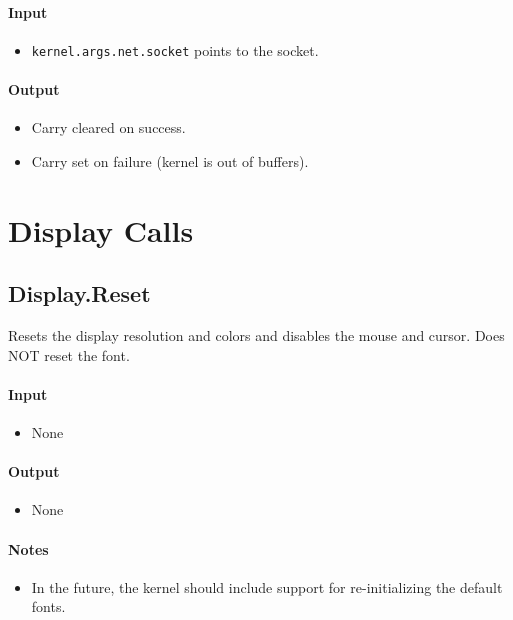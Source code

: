 \paragraph{Input}
\begin{itemize}
\item \verb+kernel.args.net.socket+ points to the socket.
\end{itemize}

\paragraph{Output}
\begin{itemize}
\item Carry cleared on success.
\item Carry set on failure (kernel is out of buffers).
\end{itemize}

\section*{Display Calls}

\subsection*{Display.Reset}
Resets the display resolution and colors and disables the mouse and cursor.  Does NOT reset the font.

\paragraph{Input}
\begin{itemize}
\item None
\end{itemize}

\paragraph{Output}
\begin{itemize}
\item None
\end{itemize}

\paragraph{Notes}
\begin{itemize}
\item In the future, the kernel should include support for re-initializing the default fonts.
\end{itemize}

